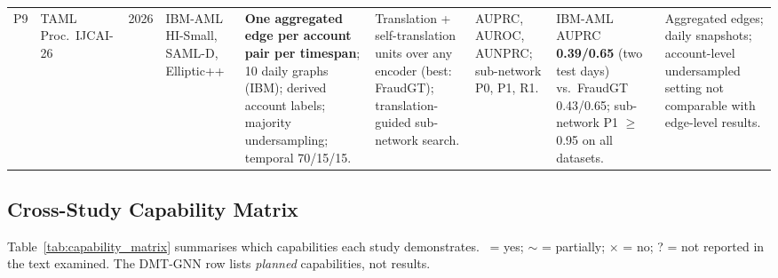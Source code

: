 \documentclass[11pt,a4paper]{article}
\begin{document}
\begin{landscape}
\begin{longtable}{L{0.55cm} L{2.3cm} L{0.8cm} L{2.6cm} L{2.9cm} L{3.0cm} L{2.1cm} L{3.2cm} L{3.6cm}}
\midrule
P9 & TAML \cite{rico2026taml}\newline Proc.\ IJCAI-26 & 2026 & IBM-AML HI-Small, SAML-D, Elliptic++ & \textbf{One aggregated edge per account pair per timespan}; 10 daily graphs (IBM); derived account labels; majority undersampling; temporal 70/15/15. & Translation + self-translation units over any encoder (best: FraudGT); translation-guided sub-network search. & AUPRC, AUROC, AUNPRC; sub-network P0, P1, R1. & IBM-AML AUPRC \textbf{0.39/0.65} (two test days) vs.\ FraudGT 0.43/0.65; sub-network P1 $\geq$0.95 on all datasets. & Aggregated edges; daily snapshots; account-level undersampled setting not comparable with edge-level results. \\
\end{longtable}
\end{landscape}

\subsection{Cross-Study Capability Matrix}
Table~\ref{tab:capability_matrix} summarises which capabilities each study demonstrates. \checkmark\ = yes; $\sim$ = partially; $\times$ = no; ? = not reported in the text examined. The DMT-GNN row lists \emph{planned} capabilities, not results.
\end{document}
